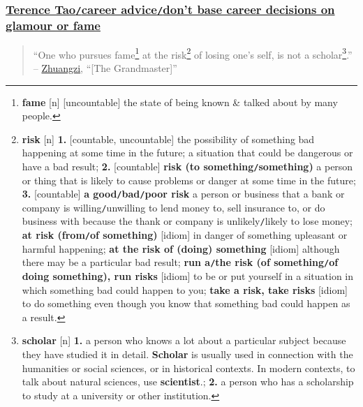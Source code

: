 \documentclass{article}
\numberwithin{equation}{section}
\begin{document}
\subsubsection{\href{https://terrytao.wordpress.com/career-advice/don't-base-career-decisions-on-glamour-or-fame/}{Terence Tao\texttt{/}career advice\texttt{/}don't base career decisions on glamour or fame}}
\begin{quotation}
	``One who pursues fame\footnote{\textbf{fame} [n] [uncountable] the state of being known \& talked about by many people.} at the risk\footnote{\textbf{risk} [n] \textbf{1.} [countable, uncountable] the possibility of something bad happening at some time in the future; a situation that could be dangerous or have a bad result; \textbf{2.} [countable] \textbf{risk (to something\texttt{/}something)} a person or thing that is likely to cause problems or danger at some time in the future; \textbf{3.} [countable] \textbf{a good\texttt{/}bad\texttt{/}poor risk} a person or business that a bank or company is willing\texttt{/}unwilling to lend money to, sell insurance to, or do business with because the thank or company is unlikely\texttt{/}likely to lose money; \textbf{at risk (from\texttt{/}of something)} [idiom] in danger of something upleasant or harmful happening; \textbf{at the risk of (doing) something} [idiom] although there may be a particular bad result; \textbf{run a\texttt{/}the risk (of something\texttt{/}of doing something), run risks} [idiom] to be or put yourself in a situation in which something bad could happen to you; \textbf{take a risk, take risks} [idiom] to do something even though you know that something bad could happen as a result.} of losing one's self, is not a scholar\footnote{\textbf{scholar} [n] \textbf{1.} a person who knows a lot about a particular subject because they have studied it in detail. \textbf{Scholar} is usually used in connection with the humanities or social sciences, or in historical contexts. In modern contexts, to talk about natural sciences, use \textbf{scientist}.; \textbf{2.} a person who has a scholarship to study at a university or other institution.}.'' -- \href{http://en.wikipedia.org/wiki/Zhuangzi}{Zhuangzi}, ``[The Grandmaster]''
\end{quotation}
\end{document}

